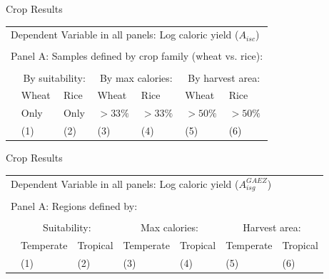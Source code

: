 \documentclass[10pt, xcolor=dvipsnames]{beamer}
\begin{document}
\begin{frame}{Crop Results}\label{cropreg}
{\footnotesize
\begin{tabularx}{\textwidth}{lXXXXXX}
\midrule
\multicolumn{7}{l}{Dependent Variable in all panels: Log caloric yield ($A_{isc}$)} \\ \\
\multicolumn{7}{l}{Panel A: Samples defined by crop family (wheat vs. rice):} \\ \\
 & \multicolumn{2}{c}{By suitability:} & \multicolumn{2}{c}{By max calories:} & \multicolumn{2}{c}{By harvest area:}\\ \cmidrule(lr){2-3} \cmidrule(lr){4-5} \cmidrule(lr){6-7} 
 & Wheat & Rice & Wheat  & Rice  & Wheat  & Rice \\
 & Only & Only &  $>33\%$ & $>33\%$ & $>50\%$ & $>50\%$   \\
 & (1) & (2) & (3) & (4) & (5) & (6) \\
\midrule

\midrule
\end{tabularx}
}

\hfill \hyperlink{crop}{}
\end{frame}

\begin{frame}{Crop Results}

{\footnotesize
\begin{tabularx}{\textwidth}{lXXXXXX}
\midrule
\multicolumn{7}{l}{Dependent Variable in all panels: Log caloric yield ($A^{GAEZ}_{isg}$)} \\ \\
\multicolumn{7}{l}{Panel A: Regions defined by:} \\ \\
 & \multicolumn{2}{c}{Suitability:} & \multicolumn{2}{c}{Max calories:} & \multicolumn{2}{c}{Harvest area:}\\ \cmidrule(lr){2-3} \cmidrule(lr){4-5} \cmidrule(lr){6-7} 
 & Temperate & Tropical & Temperate  & Tropical  & Temperate  & Tropical \\
 & (1) & (2) & (3) & (4) & (5) & (6) \\
\midrule

\midrule
\end{tabularx}
}
\end{frame}
\end{document}
